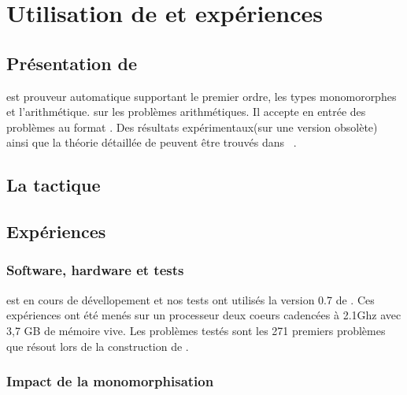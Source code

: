\section{Utilisation de \beagle et expériences}
\label{sec:experiences}

\subsection{Présentation de \beagle}
\beagle est prouveur automatique supportant le premier ordre, les types
monomororphes et l'arithmétique. sur les problèmes arithmétiques. Il
accepte en entrée des problèmes au format \tff. Des résultats
expérimentaux(sur une version obsolète) ainsi que la théorie détaillée
de \beagle peuvent être trouvés dans
~\cite{DBLP:conf/cade/BaumgartnerW13}.


\subsection{La tactique \beagletac}
\label{sec:experiences:beagletac}

\todo


\subsection{Expériences}
\label{sec:experiences:experiences}

\subsubsection{Software, hardware et tests}
\beagle est en cours de dévellopement et nos tests ont utilisés la version 0.7 de \beagle.
 Ces expériences ont été menés sur un processeur deux coeurs cadencées à 2.1Ghz avec 3,7 GB de mémoire vive. Les problèmes testés sont les 271 premiers problèmes que \metis résout lors de la construction de \holfour.


\subsubsection{Impact de la monomorphisation}

